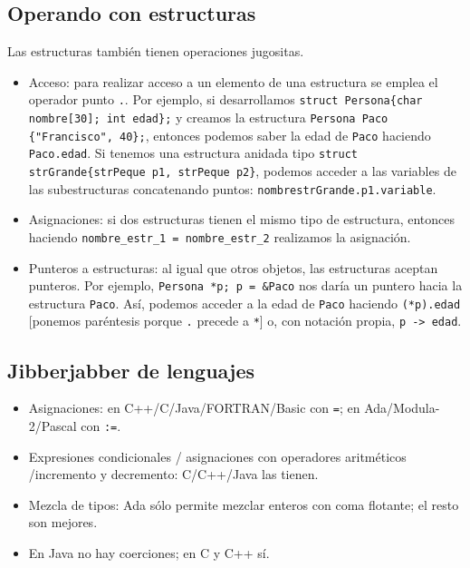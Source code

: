 \documentclass[a4paper]{article}
\begin{document}
	 
	 \subsection{Operando con estructuras}
	 Las estructuras también tienen operaciones jugositas.
	 
	 \begin{itemize}
	 	\item Acceso: para realizar acceso a un elemento de una estructura se emplea el operador punto \verb|.|. Por ejemplo, si desarrollamos \verb|struct Persona{char nombre[30]; int edad};| y creamos la estructura \verb|Persona Paco {"Francisco", 40};|, entonces podemos saber la edad de \verb|Paco| haciendo \verb|Paco.edad|. Si tenemos una estructura anidada tipo \verb|struct strGrande{strPeque p1, strPeque p2}|, podemos acceder a las variables de las subestructuras concatenando puntos: \verb|nombrestrGrande.p1.variable|.
	 	\item Asignaciones: si dos estructuras tienen el mismo tipo de estructura, entonces haciendo \verb|nombre_estr_1 = nombre_estr_2| realizamos la asignación.
	 	\item Punteros a estructuras: al igual que otros objetos, las estructuras aceptan punteros. Por ejemplo, \verb|Persona *p; p = &Paco| nos daría un puntero hacia la estructura \verb|Paco|. Así, podemos acceder a la edad de \verb|Paco| haciendo \verb|(*p).edad| [ponemos paréntesis porque \verb|.| precede a \verb|*|] o, con notación propia, \verb|p -> edad|.
	 \end{itemize}
	 
	 
	 
	\subsection{Jibberjabber de lenguajes}
	\begin{itemize}
		\item Asignaciones: en C++/C/Java/FORTRAN/Basic con \verb|=|; en Ada/Modula-2/Pascal con \verb|:=|.
		\item Expresiones condicionales / asignaciones con operadores aritméticos /incremento y decremento: C/C++/Java las tienen.
		\item Mezcla de tipos: Ada sólo permite mezclar enteros con coma flotante; el resto son mejores.
		\item En Java no hay coerciones; en C y C++ sí.
	\end{itemize}
	 
	 
	 
\end{document}
